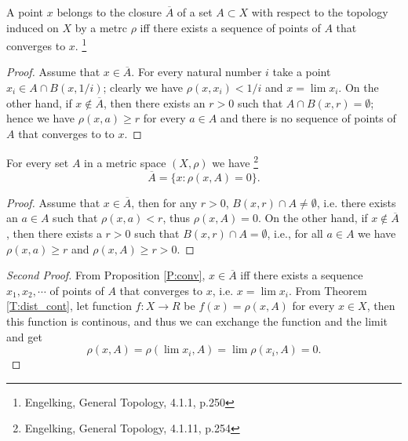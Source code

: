 \begin{proposition} \label{P:conv}
A point $x$ belongs to the closure $\overline{A}$ of a set $A\subset X$ with respect
to the topology induced on $X$ by a metrc $\rho$ iff there exists a sequence of
points of $A$ that converges to $x$.
\footnote{Engelking, General Topology, 4.1.1, p.250}
\end{proposition}
\begin{proof}
Assume that $x\in \overline{A}$. For every natural number $i$ take a point 
$x_i\in A\cap B(x,1/i)$; clearly we have $\rho(x,x_i)<1/i$ and $x=\lim{x_i}$.
On the other hand, if $x\notin \overline{A}$, then there exists an $r>0$ such that
$A\cap B(x,r)=\emptyset$; hence we have $\rho(x,a)\ge r$ for every $a\in A$ and
there is no sequence of points of $A$ that converges to to $x$.
\end{proof}




\begin{corollary} \label{C:closure_m}
For every set $A$ in a metric space $(X,\rho)$ we have
\footnote{Engelking, General Topology, 4.1.11, p.254}
\[
  \overline{A} = \{ x: \rho(x,A)=0  \}.
\]
\end{corollary}
\begin{proof}
Assume that $x\in\overline{A}$, then for any $r>0$, $B(x,r)\cap A\neq\emptyset$, i.e.
there exists an $a\in A$ such that $\rho(x,a)<r$, thus $\rho(x,A)=0$. On the
other hand, if $x\notin \overline{A}$, then there exists a $r>0$ such that
$B(x,r)\cap A=\emptyset$, i.e., for all $a\in A$ we have $\rho(x,a)\ge r$ and
$\rho(x,A)\ge r>0$.
\end{proof}
\begin{proof}[Second Proof]
From Proposition \ref{P:conv}, $x\in \overline{A}$ iff there exists a sequence
$x_1,x_2,\cdots$ of points of $A$ that converges to $x$, i.e. $x=\lim{x_i}$.
From Theorem \ref{T:dist_cont}, let function $f:X\to R$ be 
$f(x)=\rho(x,A)$ for every $x\in X$, then this function is continous,
and thus we can exchange the function and the limit and get
\[
  \rho(x,A)=\rho(\lim{x_i},A)=\lim\rho(x_i,A)=0.
\]
\end{proof}


